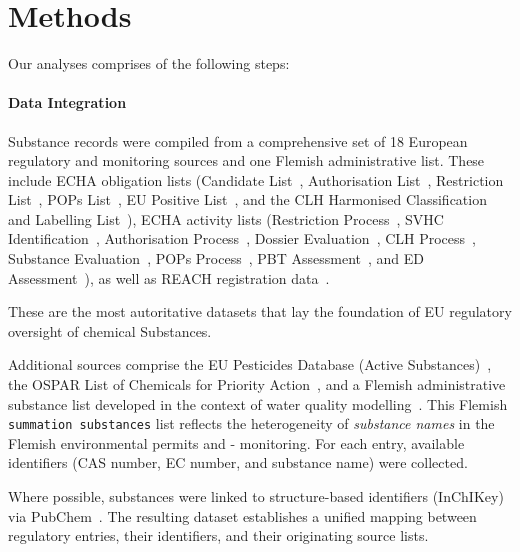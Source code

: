 \section{Methods}
\label{sec:methods}

Our analyses comprises of the following steps:

\paragraph{Data Integration}

Substance records were compiled from a comprehensive set of 18 European regulatory and monitoring sources and one Flemish administrative list. These include ECHA obligation lists (Candidate List~\cite{ECHA_CandidateList}, Authorisation List~\cite{ECHA_AuthorisationList}, Restriction List~\cite{ECHA_RestrictionList}, POPs List~\cite{ECHA_POPsList}, EU Positive List~\cite{ECHA_EUPositiveList}, and the CLH Harmonised Classification and Labelling List~\cite{ECHA_CLHList}), ECHA activity lists (Restriction Process~\cite{ECHA_RestrictionProcess}, SVHC Identification~\cite{ECHA_SVHCIdentification}, Authorisation Process~\cite{ECHA_AuthorisationProcess}, Dossier Evaluation~\cite{ECHA_DossierEvaluation}, CLH Process~\cite{ECHA_CLHProcess}, Substance Evaluation~\cite{ECHA_SubstanceEvaluation}, POPs Process~\cite{ECHA_POPsProcess}, PBT Assessment~\cite{ECHA_PBTAssessment}, and ED Assessment~\cite{ECHA_EDAssessment}), as well as REACH registration data~\cite{ECHA_REACHRegistrations}. 

These are the most autoritative datasets that lay the foundation of EU regulatory oversight of chemical Substances.

Additional sources comprise the EU Pesticides Database (Active Substances)~\cite{EU_Pesticides}, the OSPAR List of Chemicals for Priority Action~\cite{OSPAR_PriorityChemicals}, and a Flemish administrative substance list developed in the context of water quality modelling~\cite{Vlaanderen_SommatieStoffen}. This Flemish \texttt{summation substances} list reflects the heterogeneity of \emph{substance names} in the Flemish environmental permits and - monitoring. For each entry, available identifiers (CAS number, EC number, and substance name) were collected.

Where possible, substances were linked to structure-based identifiers (InChIKey) via PubChem~\cite{Kim2015}. The resulting dataset establishes a unified mapping between regulatory entries, their identifiers, and their originating source lists.

